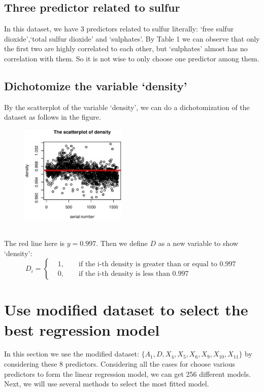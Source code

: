 \documentclass[11pt, oneside]{article}   	%
\begin{document}
\subsection{Three predictor related to sulfur}
In this dataset, we have 3 predictors related to sulfur literally: `free sulfur dioxide',`total sulfur dioxide' and `sulphates'. By Table 1 we can observe that only the first two are highly correlated to each other, but `sulphates' almost has no correlation with them. So it is not wise to only choose one predictor among them.
\subsection{Dichotomize the variable `density'}
By the scatterplot of the variable `density', we can do a dichotomization of the dataset as follows in the figure.
\begin{figure}[!htbp] 
\centering\includegraphics[width=2in]{density.eps}  
\end{figure}
\\
The red line here is $y=0.997$. Then we define $D$ as a new variable to show `density':
\begin{equation}
D_i=
\left\{
\begin{aligned}
&1,\qquad\text{if the i-th density is greater than or equal to 0.997}\\
&0,\qquad\text{if the i-th density is less than 0.997}
\end{aligned}
\right.
\end{equation}
\section{Use modified dataset to select the best regression model}
In this section we use the modified dataset: $\{A_1,D,X_4,X_5,X_6,X_9,X_{10},X_{11}\}$ by considering these 8 predictors. Considering all the cases for choose various predictors to form the linear regression model, we can get 256 different models. Next, we will use several methods to select the most fitted model.
\end{document}
